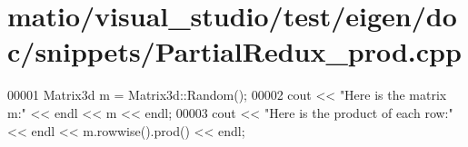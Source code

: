 \hypertarget{matio_2visual__studio_2test_2eigen_2doc_2snippets_2_partial_redux__prod_8cpp_source}{}\section{matio/visual\+\_\+studio/test/eigen/doc/snippets/\+Partial\+Redux\+\_\+prod.cpp}
\label{matio_2visual__studio_2test_2eigen_2doc_2snippets_2_partial_redux__prod_8cpp_source}

\begin{DoxyCode}
00001 Matrix3d m = Matrix3d::Random();
00002 cout << \textcolor{stringliteral}{"Here is the matrix m:"} << endl << m << endl;
00003 cout << \textcolor{stringliteral}{"Here is the product of each row:"} << endl << m.rowwise().prod() << endl;
\end{DoxyCode}
